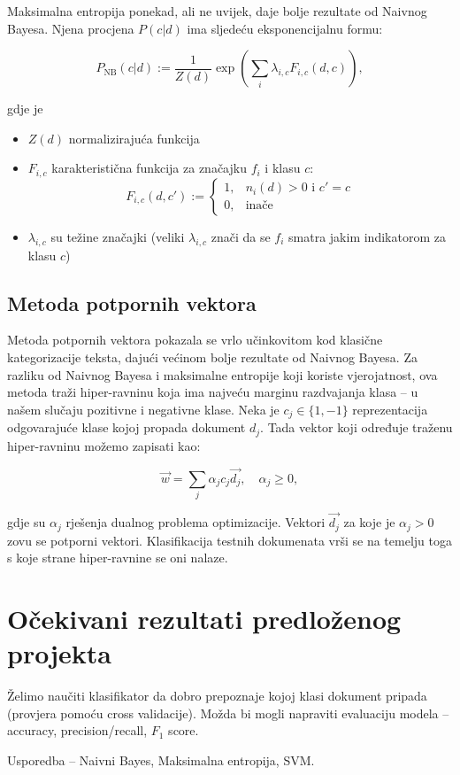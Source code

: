 \documentclass[12pt,a4paper,titlepage]{article}
\begin{document}
Maksimalna entropija ponekad, ali ne uvijek, daje bolje rezultate od Naivnog Bayesa. Njena procjena $P(c|d)$ ima sljedeću eksponencijalnu formu:

\[
  P_\text{NB}(c|d) := \frac{1}{Z(d)} \exp \left(\sum_i \lambda_{i,c} F_{i,c}(d,c)\right),
\]

gdje je

\begin{itemize}
  \item $Z(d)$ normalizirajuća funkcija
  \item $F_{i,c}$ karakteristična funkcija za značajku $f_i$ i klasu $c$:
    \[
      F_{i,c}(d,c') := \begin{cases}
                         1, & n_i(d) > 0 \text{ i } c' = c\\
                         0, & \text{inače}
                       \end{cases}
    \]
  \item $\lambda_{i,c}$ su težine značajki (veliki $\lambda_{i,c}$ znači da se $f_i$ smatra jakim indikatorom za klasu $c$)
\end{itemize}

\subsection{Metoda potpornih vektora}

Metoda potpornih vektora pokazala se vrlo učinkovitom kod klasične kategorizacije teksta, dajući većinom bolje rezultate od Naivnog Bayesa. Za razliku od Naivnog Bayesa i maksimalne entropije koji koriste vjerojatnost, ova metoda traži hiper-ravninu koja ima najveću marginu razdvajanja klasa -- u našem slučaju pozitivne i negativne klase. Neka je $c_j \in \{1, -1\}$ reprezentacija odgovarajuće klase kojoj propada dokument $d_j$. Tada vektor koji određuje traženu hiper-ravninu možemo zapisati kao:

\[
	\vec{w} = \sum_j \alpha_j c_j \vec{d_j}, \quad \alpha_j \ge 0,
\]

gdje su $\alpha_j$ rješenja dualnog problema optimizacije. Vektori $\vec{d_j}$ za koje je $\alpha_j > 0$ zovu se potporni vektori. Klasifikacija testnih dokumenata vrši se na temelju toga s koje strane hiper-ravnine se oni nalaze.

\section{Očekivani rezultati predloženog projekta}

Želimo naučiti klasifikator da dobro prepoznaje kojoj klasi dokument pripada (provjera pomoću cross validacije). Možda bi mogli napraviti evaluaciju modela -- accuracy, precision/recall, $F_1$ score.

Usporedba -- Naivni Bayes, Maksimalna entropija, SVM.

\newpage

\nocite{*}



\end{document}
